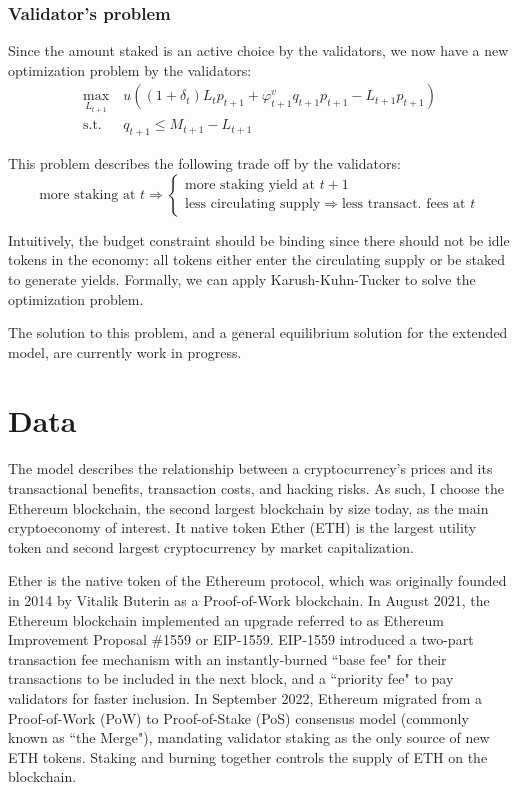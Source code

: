 \documentclass[12pt]{article}
\begin{document}
\subsubsection{Validator's problem}
Since the amount staked is an active choice by the validators, we now have a new optimization problem by the validators:
\begin{align}
\max_{L_{t+1}}\ & u((1+\delta_t) L_t p_{t+1} + \varphi_{t+1}^v q_{t+1} p_{t+1} - L_{t+1}p_{t+1})\\
    \text{s.t. } & q_{t+1} \leq M_{t+1} - L_{t+1} \nonumber
\end{align}

This problem describes the following trade off by the validators:
\[
\text{more staking at } t \Rightarrow
\begin{cases}
    \text{more staking yield at } t+1\\
    \text{less circulating supply} \Rightarrow \text{less transact. fees at } t
\end{cases}
\]

Intuitively, the budget constraint should be binding since there should not be idle tokens in the economy: all tokens either enter the circulating supply or be staked to generate yields. Formally, we can apply Karush-Kuhn-Tucker to solve the optimization problem. 

The solution to this problem, and a general equilibrium solution for the extended model, are currently work in progress.



\section{Data}
\label{sec:data}
The model describes the relationship between a cryptocurrency's prices and its transactional benefits, transaction costs, and hacking risks. As such, I choose the Ethereum blockchain, the second largest blockchain by size today, as the main cryptoeconomy of interest. It native token Ether (ETH) is the largest utility token and second largest cryptocurrency by market capitalization.

Ether is the native token of the Ethereum protocol, which was originally founded in 2014 by Vitalik Buterin as a Proof-of-Work blockchain. In August 2021, the Ethereum blockchain implemented an upgrade referred to as Ethereum Improvement Proposal \#1559 or EIP-1559. EIP-1559 introduced a two-part transaction fee mechanism with an instantly-burned ``base fee" for their transactions to be included in the next block, and a ``priority fee" to pay validators for faster inclusion. In September 2022, Ethereum migrated from a Proof-of-Work (PoW) to Proof-of-Stake (PoS) consensus model (commonly known as ``the Merge"), mandating validator staking as the only source of new ETH tokens. Staking and burning together controls the supply of ETH on the blockchain.
\end{document}
